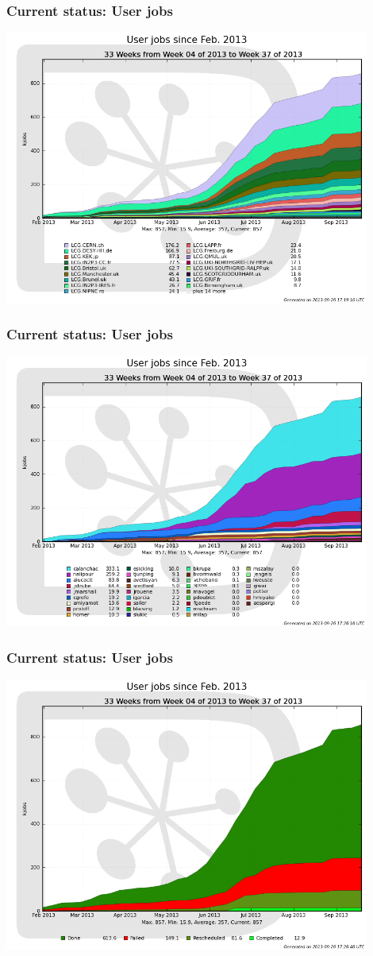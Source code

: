 \documentclass[10pt,table,dvipsnames]{beamer}
\begin{document}
\begin{frame}
\frametitle{Current status: User jobs}
\centering
\includegraphics[width=0.9\textwidth]{userjobs}
\end{frame}
\begin{frame}
\frametitle{Current status: User jobs}
\centering
\includegraphics[width=0.9\textwidth]{userjobsperuser}
\end{frame}
\begin{frame}
\frametitle{Current status: User jobs}
\centering
\includegraphics[width=0.9\textwidth]{userjobsperstatus}
\end{frame}
\end{document}

